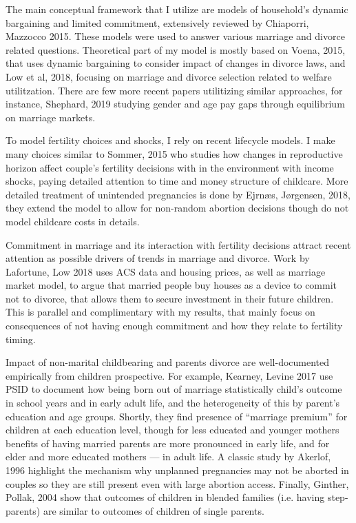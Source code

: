 \documentclass[12pt,letter]{article}
\begin{document}
The main conceptual framework that I utilize are models of household's dynamic bargaining and limited commitment, extensively reviewed by Chiaporri, Mazzocco 2015.\nocite{chiappori-review} These models were used to answer various marriage and divorce related questions. Theoretical part of my model is mostly based on Voena, 2015\nocite{voena-1}, that uses dynamic bargaining to consider impact of changes in divorce laws, and Low et al, 2018\nocite{low-1}, focusing on marriage and divorce selection related to welfare utilitzation. There are few more recent papers utilitizing similar approaches, for instance, Shephard, 2019\nocite{shephard} studying gender and age pay gaps through equilibrium on marriage markets. 

To model fertility choices and shocks, I rely on recent lifecycle models. I make many choices similar to Sommer, 2015\nocite{sommer} who studies how changes in reproductive horizon affect couple's fertility decisions with in the environment with income shocks, paying detailed attention to time and money structure of childcare. More detailed treatment of unintended pregnancies is done by Ejrnæs, Jørgensen, 2018\nocite{ejrnaes}, they extend the model to allow for non-random abortion decisions though do not model childcare costs in details. 

Commitment in marriage and its interaction with fertility decisions attract recent attention as possible drivers of trends in marriage and divorce. Work by Lafortune, Low 2018\nocite{lafortune-1} uses ACS data and housing prices, as well as marriage market model, to argue that married people buy houses as a device to commit not to divorce, that allows them to secure investment in their future children. This is parallel and complimentary with my results, that mainly focus on consequences of not having enough commitment and how they relate to fertility timing. 

Impact of non-marital childbearing and parents divorce are well-documented empirically from children prospective. For example, Kearney, Levine 2017 use PSID to document how being born out of marriage statistically child's outcome in school years and in early adult life, and the heterogeneity of this by parent's education and age groups. Shortly, they find presence of ``marriage premium'' for children at each education level, though for less educated and younger mothers benefits of having married parents are more pronounced in early life, and for elder and more educated mothers --- in adult life. A classic study by Akerlof, 1996\nocite{akerlof} highlight the mechanism why unplanned pregnancies may not be aborted in couples so they are still present even with large abortion access. Finally, Ginther, Pollak, 2004 show that outcomes of children in blended families (i.e. having step-parents) are similar to outcomes of children of single parents. 
\end{document}
